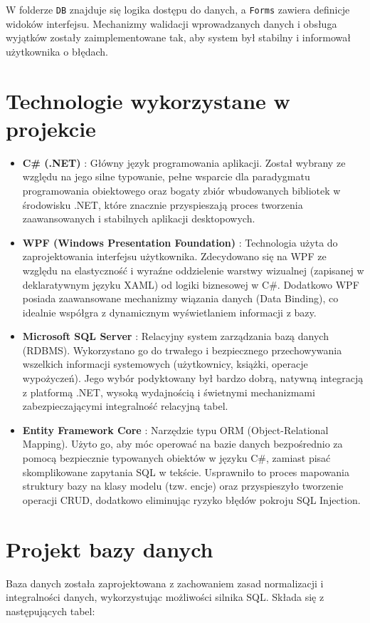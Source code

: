 W folderze \texttt{DB} znajduje się logika dostępu do danych, a \texttt{Forms} zawiera definicje widoków interfejsu. Mechanizmy walidacji wprowadzanych danych i obsługa wyjątków zostały zaimplementowane tak, aby system był stabilny i informował użytkownika o błędach.

\chapter{Technologie wykorzystane w projekcie}
\begin{itemize}
    \item \textbf{C\# (.NET)} \cite{CSharpDocs}: Główny język programowania aplikacji. Został wybrany ze względu na jego silne typowanie, pełne wsparcie dla paradygmatu programowania obiektowego oraz bogaty zbiór wbudowanych bibliotek w środowisku .NET, które znacznie przyspieszają proces tworzenia zaawansowanych i stabilnych aplikacji desktopowych.
    \item \textbf{WPF (Windows Presentation Foundation)} \cite{WPFDocs}: Technologia użyta do zaprojektowania interfejsu użytkownika. Zdecydowano się na WPF ze względu na elastyczność i wyraźne oddzielenie warstwy wizualnej (zapisanej w deklaratywnym języku XAML) od logiki biznesowej w C\#. Dodatkowo WPF posiada zaawansowane mechanizmy wiązania danych (Data Binding), co idealnie współgra z dynamicznym wyświetlaniem informacji z bazy.
    \item \textbf{Microsoft SQL Server} \cite{SQLServerDocs}: Relacyjny system zarządzania bazą danych (RDBMS). Wykorzystano go do trwałego i bezpiecznego przechowywania wszelkich informacji systemowych (użytkownicy, książki, operacje wypożyczeń). Jego wybór podyktowany był bardzo dobrą, natywną integracją z platformą .NET, wysoką wydajnością i świetnymi mechanizmami zabezpieczającymi integralność relacyjną tabel.
    \item \textbf{Entity Framework Core} \cite{EFCoreDocs}: Narzędzie typu ORM (Object-Relational Mapping). Użyto go, aby móc operować na bazie danych bezpośrednio za pomocą bezpiecznie typowanych obiektów w języku C\#, zamiast pisać skomplikowane zapytania SQL w tekście. Usprawniło to proces mapowania struktury bazy na klasy modelu (tzw. encje) oraz przyspieszyło tworzenie operacji CRUD, dodatkowo eliminując ryzyko błędów pokroju SQL Injection.
\end{itemize}

\chapter{Projekt bazy danych}
Baza danych została zaprojektowana z zachowaniem zasad normalizacji i integralności danych, wykorzystując możliwości silnika SQL. Składa się z następujących tabel:

